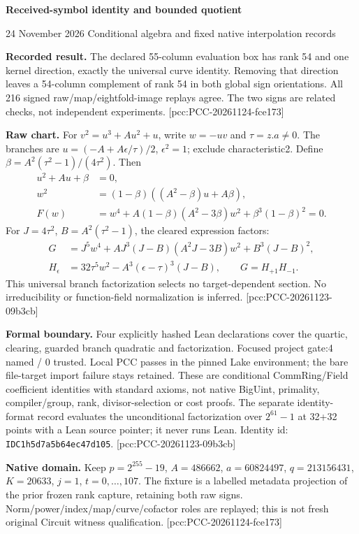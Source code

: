 \documentclass[10pt]{article}
\begin{document}
{\Large\bfseries\color{ink} Received-symbol identity and bounded quotient}\par
{\small 24 November 2026 \quad Conditional algebra and fixed native interpolation records}

\textbf{Recorded result.} The declared 55-column evaluation box has rank 54
and one kernel direction, exactly the universal curve identity. Removing
that direction leaves a 54-column complement of rank 54 in both global sign
orientations. All 216 signed raw/map/eightfold-image replays agree. The two
signs are related checks, not independent experiments.
[pcc:PCC-20261124-fce173]

\textbf{Raw chart.} For $v^2=u^3+Au^2+u$, write $w=-uv$ and
$\tau=z.a\ne0$. The branches are
$u=(-A+A\epsilon/\tau)/2$, $\epsilon^2=1$; exclude characteristic2.
Define $\beta=A^2(\tau^2-1)/(4\tau^2)$. Then
\begin{align*}
u^2+Au+\beta&=0,\\
w^2&=(1-\beta)((A^2-\beta)u+A\beta),\\
F(w)&=w^4+A(1-\beta)(A^2-3\beta)w^2+\beta^3(1-\beta)^2=0.
\end{align*}
For $J=4\tau^2$, $B=A^2(\tau^2-1)$, the cleared expression factors:
\begin{align*}
G&=J^5w^4+AJ^3(J-B)(A^2J-3B)w^2+B^3(J-B)^2,\\
H_\epsilon&=32\tau^5w^2-A^3(\epsilon-\tau)^3(J-B),\qquad
G=H_{+1}H_{-1}.
\end{align*}
This universal branch factorization selects no target-dependent section.
No irreducibility or function-field normalization is inferred.
[pcc:PCC-20261123-09b3cb]

\textbf{Formal boundary.} Four explicitly hashed Lean declarations cover the
quartic, clearing, guarded branch quadratic and factorization. Focused project
gate:4 named / 0 trusted. Local PCC passes in the pinned Lake environment;
the bare file-target import failure stays retained. These are conditional
CommRing/Field coefficient identities with standard axioms, not native
BigUint, primality, compiler/group, rank, divisor-selection or cost proofs.
The separate identity-format record evaluates the unconditional factorization
over $2^{61}-1$ at 32+32 points with a Lean source pointer; it never runs Lean.
Identity id: \texttt{IDC1h5d7a5b64ec47d105}.
[pcc:PCC-20261123-09b3cb]

\textbf{Native domain.} Keep $p=2^{255}-19$, $A=486662$, $a=60824497$,
$q=213156431$, $K=20633$, $j=1$, $t=0,\ldots,107$. The fixture is a
labelled metadata projection of the prior frozen rank capture, retaining
both raw signs. Norm/power/index/map/curve/cofactor roles are replayed;
this is not fresh original Circuit witness qualification.
[pcc:PCC-20261124-fce173]
\end{document}
